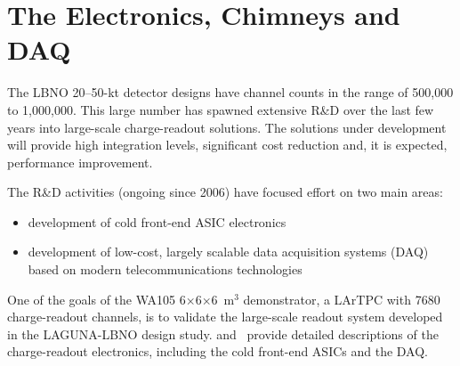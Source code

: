 \section{The Electronics, Chimneys and DAQ}
\label{sec:detectors-fd-alt-elec}

The LBNO 20--50-kt detector designs have channel
counts in the range of 500,000 to 1,000,000. This large number has spawned extensive
 R\&D over the last few years into large-scale charge-readout solutions.  The 
 solutions under development will provide 
high integration levels, significant cost reduction and, it is expected, 
performance improvement.


The R\&D activities (ongoing since 2006) have focused effort on two main areas: %
\begin {itemize} 
\item{development of cold front-end ASIC electronics}
\item{development of low-cost, largely scalable data 
acquisition systems (DAQ) based on modern telecommunications technologies}
\end{itemize}

One of the goals
of the WA105 6$\times$6$\times$6~m$^3$ demonstrator, a LArTPC with \num{7680}
charge-readout channels, is to validate the large-scale readout
system developed in the LAGUNA-LBNO design study. \anxdualtdr and~\cite{WA105_SREP}
provide detailed
descriptions of the charge-readout electronics, including the cold front-end ASICs and the DAQ.

